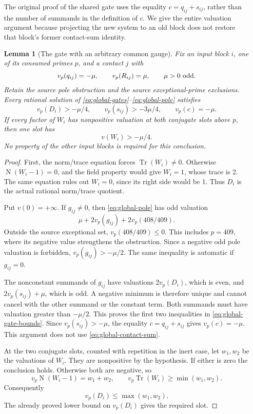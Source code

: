 \documentclass[11pt]{article}
\newtheorem{lemma}[theorem]{Lemma}
\begin{document}
The original proof of the shared gate uses the equality
\(c=q_{ij}+s_{ij}\), rather than the number of summands in
the definition of \(c\). We give the entire valuation
argument because projecting the new system to an old
block does not restore that block's former contact-sum
identity.

\begin{lemma}[The gate with an arbitrary common gauge]
\label{lem:global-gate}
Fix an input block \(i\), one of its consumed primes
\(p\), and a contact \(j\) with
\[
            v_p(q_{ij})=-\mu,\qquad
            v_p(R_{ij})=\mu,\qquad \mu>0\ \hbox{odd}.
\]
Retain the source pole obstruction and the source
exceptional-prime exclusions. Every rational solution
of \eqref{eq:global-gates}--\eqref{eq:global-pole}
satisfies
\begin{equation}\label{eq:global-gate-bounds}
 v_p(D_i)>-\mu/4,\qquad
 v_p(s_{ij})>-3\mu/4,\qquad v_p(c)=-\mu.
\end{equation}
If every factor of \(W_i\) has nonpositive valuation
at both conjugate slots above \(p\), then one slot has
\[
                              v(W_i)>-\mu/4 .
\]
No property of the other input blocks is required
for this conclusion.
\end{lemma}
\begin{proof}
First, the norm/trace equation forces
\(\operatorname{Tr}(W_i)\ne0\). Otherwise
\(\operatorname{N}(W_i-1)=0\), and the field property
would give \(W_i=1\), whose trace is 2. The same
equation rules out \(W_i=0\), since its right side
would be 1. Thus \(D_i\) is the actual rational
norm/trace quotient.

Put \(v(0)=+\infty\). If \(g_{ij}\ne0\), then
\eqref{eq:global-pole} has odd valuation
\[
       \mu+2v_p(g_{ij})+2v_p(408/409).
\]
Outside the source exceptional set,
\(v_p(408/409)\le0\). This includes \(p=409\),
where its negative value strengthens the
obstruction. Since a negative odd pole valuation
is forbidden, \(v_p(g_{ij})>-\mu/2\).
The same inequality is automatic if \(g_{ij}=0\).

The nonconstant summands of \(g_{ij}\) have
valuations \(2v_p(D_i)\), which is even, and
\(2v_p(s_{ij})+\mu\), which is odd.
A negative minimum is therefore unique and
cannot cancel with the other summand or the
constant term. Both summands must have valuation
greater than \(-\mu/2\). This proves the first
two inequalities in \eqref{eq:global-gate-bounds}.
Since \(v_p(s_{ij})>-\mu\), the equality
\(c=q_{ij}+s_{ij}\) gives \(v_p(c)=-\mu\).
This argument does not use
\eqref{eq:global-contact-sum}.

At the two conjugate slots, counted with
repetition in the inert case, let \(w_1,w_2\)
be the valuations of \(W_i\). They are
nonpositive by the hypothesis. If either is
zero the conclusion holds. Otherwise both
are negative, so
\[
 v_p\operatorname{N}(W_i-1)=w_1+w_2,\qquad
 v_p\operatorname{Tr}(W_i)\ge\min(w_1,w_2).
\]
Consequently
\[
           v_p(D_i)\le\max(w_1,w_2).
\]
The already proved lower bound on \(v_p(D_i)\)
gives the required slot.
\end{proof}
\end{document}
